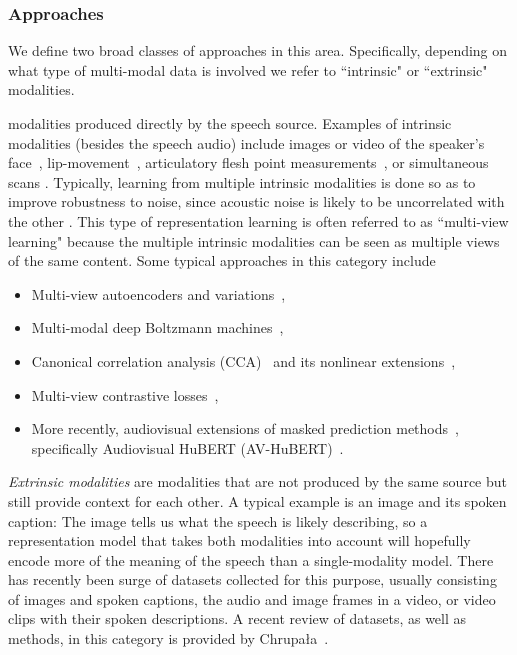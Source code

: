\subsubsection{Approaches}
We define two broad classes of approaches in this area. Specifically, depending on what type of multi-modal data is involved we refer to ``intrinsic" or ``extrinsic" modalities.

modalities produced directly by the speech source.  Examples of intrinsic modalities (besides the speech audio) include images or video of the speaker's face~\parencite{lee_avicar_2004,chung_lip_2016}, lip-movement~\parencite{shi_learning_2022}, articulatory flesh point measurements~\parencite{westbury_xray_1990,wrench_new_2001}, or simultaneous  scans \parencite{narayanan_multimodal_2011}.  Typically, learning from multiple intrinsic modalities is done so as to improve robustness to noise, since acoustic noise is likely to be uncorrelated with the other .  This type of representation learning is often referred to as ``multi-view learning" because the multiple intrinsic modalities can be seen as multiple views of the same content. Some typical approaches in this category include
\begin{itemize}
    \item Multi-view autoencoders and variations~\parencite{ngiam_multimodal_2011,badino_integrating_2016},
    \item Multi-modal deep Boltzmann machines~\parencite{srivastava_multimodal_2012},
    \item Canonical correlation analysis (CCA)~\parencite{hotelling_relations_1936} and its nonlinear extensions~\parencite{andrew_deep_2013,wang_deep_2015,wang_deep_2016,michaeli_nonparametric_2016,melzer_nonlinear_2001,lai_kernel_2000,lai_neural_1999,bach_probabilistic_2005,wang_unsupervised_2015},
    \item Multi-view contrastive losses~\parencite{hermann_multilingual_2013,huang_learning_2013},
    \item More recently, audiovisual extensions of masked prediction methods~\parencite{shi_learning_2022,shi_robust_2022}, specifically Audiovisual HuBERT (AV-HuBERT)~\parencite{shi_learning_2022}.
\end{itemize}

\textit{Extrinsic modalities} are modalities that are not produced by the same source but still provide context for each other. A typical example is an image and its spoken caption: The image tells us what the speech is likely describing, so a representation model that takes both modalities into account will hopefully encode more of the meaning of the speech than a single-modality model. 
There has recently been  surge of datasets collected for this purpose, usually consisting of images and spoken captions, the audio and image frames in a video, or video clips with their spoken descriptions. A recent review of datasets, as well as methods, in this category is provided by Chrupa\l{}a~\parencite{chrupala_visually_2021}. 

